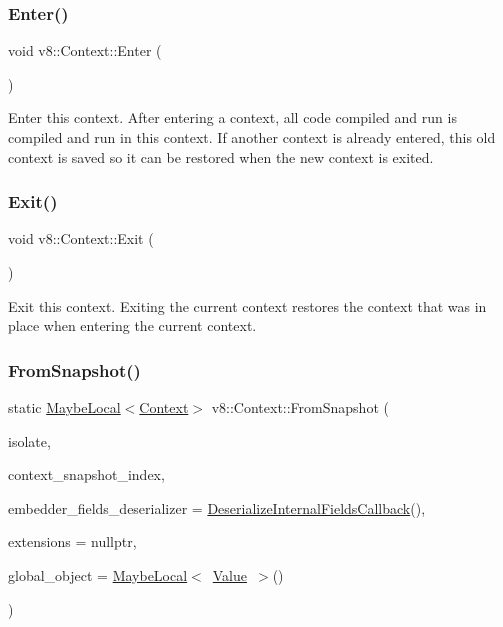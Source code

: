 \subsubsection{\texorpdfstring{Enter()}{Enter()}}
{\footnotesize\ttfamily void v8\+::\+Context\+::\+Enter (\begin{DoxyParamCaption}{ }\end{DoxyParamCaption})}

Enter this context. After entering a context, all code compiled and run is compiled and run in this context. If another context is already entered, this old context is saved so it can be restored when the new context is exited. \mbox{\label{classv8_1_1Context_a2db09d4fefb26023a40d88972a4c1599}} 
\subsubsection{\texorpdfstring{Exit()}{Exit()}}
{\footnotesize\ttfamily void v8\+::\+Context\+::\+Exit (\begin{DoxyParamCaption}{ }\end{DoxyParamCaption})}

Exit this context. Exiting the current context restores the context that was in place when entering the current context. \mbox{\label{classv8_1_1Context_a49a8fb02c04b6ebf4e532755d50d2ff9}} 
\subsubsection{\texorpdfstring{From\+Snapshot()}{FromSnapshot()}}
{\footnotesize\ttfamily static \mbox{\hyperlink{classv8_1_1MaybeLocal}{Maybe\+Local}}$<$\mbox{\hyperlink{classv8_1_1Context}{Context}}$>$ v8\+::\+Context\+::\+From\+Snapshot (\begin{DoxyParamCaption}\item[{\mbox{\hyperlink{classv8_1_1Isolate}{Isolate}} $\ast$}]{isolate,  }\item[{size\+\_\+t}]{context\+\_\+snapshot\+\_\+index,  }\item[{\mbox{\hyperlink{structv8_1_1DeserializeInternalFieldsCallback}{Deserialize\+Internal\+Fields\+Callback}}}]{embedder\+\_\+fields\+\_\+deserializer = {\ttfamily \mbox{\hyperlink{structv8_1_1DeserializeInternalFieldsCallback}{Deserialize\+Internal\+Fields\+Callback}}()},  }\item[{\mbox{\hyperlink{classv8_1_1ExtensionConfiguration}{Extension\+Configuration}} $\ast$}]{extensions = {\ttfamily nullptr},  }\item[{\mbox{\hyperlink{classv8_1_1MaybeLocal}{Maybe\+Local}}$<$ \mbox{\hyperlink{classv8_1_1Value}{Value}} $>$}]{global\+\_\+object = {\ttfamily \mbox{\hyperlink{classv8_1_1MaybeLocal}{Maybe\+Local}}$<$~\mbox{\hyperlink{classv8_1_1Value}{Value}}~$>$()} }\end{DoxyParamCaption})\hspace{0.3cm}{\ttfamily [static]}}

